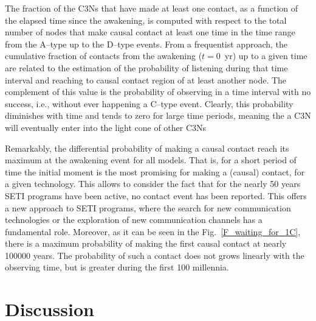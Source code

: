 \documentclass[crop]{CSLB}
\newcommand{\ceti}{C3N}
\newcommand{\cetis}{C3Ns}
\begin{document}
 

The fraction of the \cetis{} that have made at least one contact, as a
function of the elapsed time since the awakening, is computed with
respect to the total number of nodes that make causal contact at least
one time in the time range from the A--type up to the D--type
events.
%
From a frequentist approach, the cumulative fraction of contacts
from the awakening
($t=$0~yr) up to a given time are related to the estimation of the
probability of listening during that time interval and reaching to
causal contact region of at least another node.
%
The complement of this value is the probability of observing in a time
interval with no success, i.e., without ever happening a C--type
event.
%
Clearly, this probability diminishes with time and tends to zero for
large time periods, meaning the a \ceti{} will eventually enter into 
the light cone of other \cetis{}


Remarkably, the differential probability of making a causal contact reach its
maximum at the awakening event for all models.
%
That is, for a short period of time the initial moment is the most promising
for making a (causal) contact, for a given technology.
%
This allows to consider the fact that for the nearly 50 years SETI
programs have been active, no contact event has been reported.
%
This offers a new approach to SETI programs, where the
search for new communication technologies or the exploration of
new communication channels has a fundamental role.
%
Moreover, as it can be seen in the Fig.~\ref{F_waiting_for_1C}, there
is a maximum probability of making the first causal contact at nearly
100000 years.
%
The probability of such a contact does not grows linearly
with the observing time, but is greater during the first 100
millennia.


\section{Discussion}\label{S_discussion}
\end{document}
